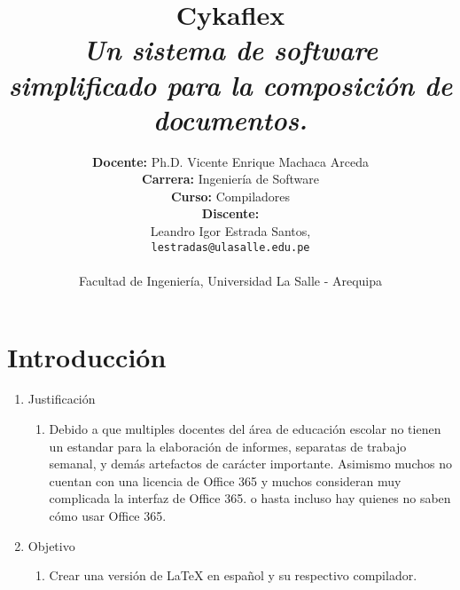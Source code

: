 \documentclass[12pt]{article}
\begin{document}
\begin{titlepage}

\title{     \textbf{Cykaflex}\\[2.5ex]
\textit{Un sistema de software simplificado
para la composición de documentos.} }

\author{    
             \textbf{Docente:} Ph.D. Vicente Enrique Machaca Arceda \\[2.5ex]
             \textbf{Carrera:} Ingeniería de Software \\[2.5ex]
             \textbf{Curso:} Compiladores \\[2.5ex]
             \textbf{Discente:} \\[2.5ex]  
             Leandro Igor Estrada Santos, \\ \texttt{ lestradas@ulasalle.edu.pe } \\[2.5ex]
                                                       \\[2.5ex]
            \normalsize{Facultad de Ingeniería, Universidad La Salle - Arequipa}        \\ 
       }
\date{}

\end{titlepage}

\maketitle
\thispagestyle{empty} 


{
  \hypersetup{linkcolor=black}
  \tableofcontents
}


\section{Introducción}
\indent
\begin{enumerate}
    \item Justificación
        \begin{enumerate}
            \item Debido a que multiples docentes del área de educación escolar no tienen un estandar para la elaboración de informes, separatas de trabajo semanal, y demás artefactos de carácter importante. Asimismo muchos no cuentan con una licencia de Office 365 y muchos consideran muy complicada la interfaz de Office 365. o hasta incluso hay quienes no saben cómo usar Office 365.
        \end{enumerate}
    \item Objetivo
        \begin{enumerate}
            \item Crear una versión de LaTeX en español y su respectivo compilador.
        \end{enumerate}
\end{enumerate}
\end{document}

